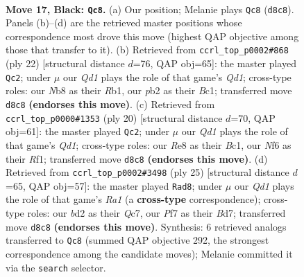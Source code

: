 \documentclass[11pt]{article}
\begin{document}
\clearpage

\begin{figure}[p]\centering
\begin{subfigure}{0.46\textwidth}\centering
\resizebox{\linewidth}{!}{%
\newchessgame
\chessboard[
  setfen={rn1qr1k1/pp1bbppp/4pn2/2Pp4/N2P4/P4N1P/1P1B1PP1/1BRQR1K1 b - - 0 17},
  showmover=false,
  pgfstyle=straightmove, color=movearrow, markmove={d8-c8}
]}
\caption{}
\end{subfigure}\hfill
\begin{subfigure}{0.46\textwidth}\centering
\resizebox{\linewidth}{!}{%
\newchessgame
\chessboard[
  setfen={r2qr1k1/pbpn1ppp/1p1b1n2/3p4/1P1P4/P1NBP3/4NPPP/1RBQ1RK1 w - - 3 12},
  showmover=false,
  pgfstyle=straightmove, color=movearrow, markmove={d1-c2}
]}
\caption{}
\end{subfigure}
\\[4pt]
\begin{subfigure}{0.46\textwidth}\centering
\resizebox{\linewidth}{!}{%
\newchessgame
\chessboard[
  setfen={r1bqr1k1/pp1n1ppp/2pb1n2/3p4/3P4/P1NBP2P/1P2NPP1/R1BQ1RK1 w - - 1 11},
  showmover=false,
  pgfstyle=straightmove, color=movearrow, markmove={d1-c2}
]}
\caption{}
\end{subfigure}\hfill
\begin{subfigure}{0.46\textwidth}\centering
\resizebox{\linewidth}{!}{%
\newchessgame
\chessboard[
  setfen={r4rk1/1pqbnpp1/p1nbp2p/3p4/3P4/2PB1N1P/PPN2PP1/R1BQR1K1 b - - 1 13},
  showmover=false,
  pgfstyle=straightmove, color=movearrow, markmove={a8-d8}
]}
\caption{}
\end{subfigure}
\caption{\textbf{Move 17, Black: \texttt{Qc8}.} (a) Our position; Melanie plays \texttt{Qc8} (\texttt{d8c8}). Panels (b)--(d) are the retrieved master positions whose correspondence most drove this move (highest QAP objective among those that transfer to it). (b) Retrieved from \texttt{ccrl\_top\_p0002\#868} (ply 22) [structural distance $d$=76, QAP obj=65]: the master played \texttt{Qc2}; under $\mu$ our \emph{Qd1} plays the role of that game's \emph{Qd1}; cross-type roles: our \emph{N}b8 as their \emph{R}b1, our \emph{p}b2 as their \emph{B}c1; transferred move \texttt{d8c8} \textbf{(endorses this move)}. (c) Retrieved from \texttt{ccrl\_top\_p0000\#1353} (ply 20) [structural distance $d$=70, QAP obj=61]: the master played \texttt{Qc2}; under $\mu$ our \emph{Qd1} plays the role of that game's \emph{Qd1}; cross-type roles: our \emph{R}e8 as their \emph{B}c1, our \emph{N}f6 as their \emph{R}f1; transferred move \texttt{d8c8} \textbf{(endorses this move)}. (d) Retrieved from \texttt{ccrl\_top\_p0002\#3498} (ply 25) [structural distance $d$=65, QAP obj=57]: the master played \texttt{Rad8}; under $\mu$ our \emph{Qd1} plays the role of that game's \emph{Ra1} (a \textbf{cross-type} correspondence); cross-type roles: our \emph{b}d2 as their \emph{Q}c7, our \emph{P}f7 as their \emph{B}d7; transferred move \texttt{d8c8} \textbf{(endorses this move)}. Synthesis: 6 retrieved analogs transferred to \texttt{Qc8} (summed QAP objective 292, the strongest correspondence among the candidate moves); Melanie committed it via the \texttt{search} selector.}
\label{fig:thought-m33}
\end{figure}
\end{document}
